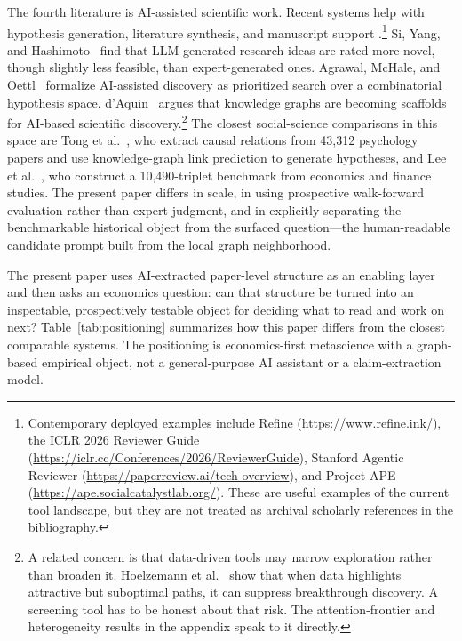 \documentclass[11pt]{article}
\begin{document}
The fourth literature is AI-assisted scientific work. Recent systems help with hypothesis generation, literature synthesis, and manuscript support \citep{zhang2025scientificmethod,shao2025sciscigpt,korinek2024generative}.\footnote{Contemporary deployed examples include Refine (\url{https://www.refine.ink/}), the ICLR 2026 Reviewer Guide (\url{https://iclr.cc/Conferences/2026/ReviewerGuide}), Stanford Agentic Reviewer (\url{https://paperreview.ai/tech-overview}), and Project APE (\url{https://ape.socialcatalystlab.org/}). These are useful examples of the current tool landscape, but they are not treated as archival scholarly references in the bibliography.} Si, Yang, and Hashimoto~\citeyearpar{si2024llmideas} find that LLM-generated research ideas are rated more novel, though slightly less feasible, than expert-generated ones. Agrawal, McHale, and Oettl~\citeyearpar{agrawal2024ai} formalize AI-assisted discovery as prioritized search over a combinatorial hypothesis space. d'Aquin~\citeyearpar{daquin2025kgdiscovery} argues that knowledge graphs are becoming scaffolds for AI-based scientific discovery.\footnote{A related concern is that data-driven tools may narrow exploration rather than broaden it. Hoelzemann et al.~\citeyearpar{hoelzemann2024streetlight} show that when data highlights attractive but suboptimal paths, it can suppress breakthrough discovery. A screening tool has to be honest about that risk. The attention-frontier and heterogeneity results in the appendix speak to it directly.} The closest social-science comparisons in this space are Tong et al.~\citeyearpar{tong2024automating}, who extract causal relations from 43{,}312 psychology papers and use knowledge-graph link prediction to generate hypotheses, and Lee et al.~\citeyearpar{lee2024econcausal}, who construct a 10{,}490-triplet benchmark from economics and finance studies. The present paper differs in scale, in using prospective walk-forward evaluation rather than expert judgment, and in explicitly separating the benchmarkable historical object from the surfaced question---the human-readable candidate prompt built from the local graph neighborhood.

The present paper uses AI-extracted paper-level structure as an enabling layer and then asks an economics question: can that structure be turned into an inspectable, prospectively testable object for deciding what to read and work on next? Table~\ref{tab:positioning} summarizes how this paper differs from the closest comparable systems. The positioning is economics-first metascience with a graph-based empirical object, not a general-purpose AI assistant or a claim-extraction model.
\end{document}
